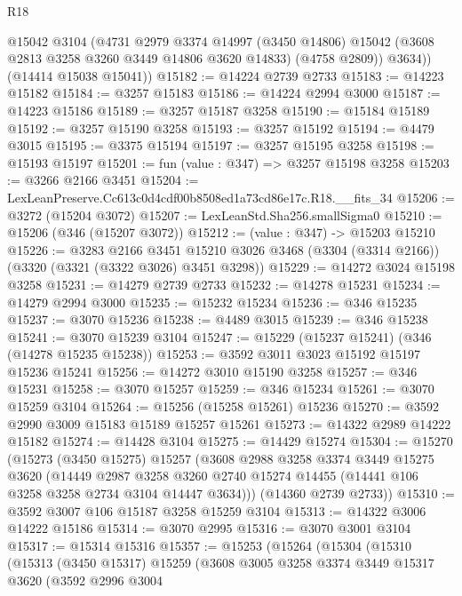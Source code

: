 \begin{lexlean}{R18}
\begin{coremodule}
          @15042
          @3104
          (@4731
            @2979
            @3374
            @14997
            (@3450 @14806)
            @15042
            (@3608 @2813 @3258 @3260 @3449 @14806 @3620 @14833)
            (@4758 @2809))
          @3634))
      (@14414 @15038 @15041))
@15182 := @14224 @2739 @2733
@15183 := @14223 @15182
@15184 := @3257 @15183
@15186 := @14224 @2994 @3000
@15187 := @14223 @15186
@15189 := @3257 @15187 @3258
@15190 := @15184 @15189
@15192 := @3257 @15190 @3258
@15193 := @3257 @15192
@15194 := @4479 @3015
@15195 := @3375 @15194
@15197 := @3257 @15195 @3258
@15198 := @15193 @15197
@15201 := fun (value : @347) => @3257 @15198 @3258
@15203 := @3266 @2166 @3451
@15204 := LexLeanPreserve.Cc613c0d4cdf00b8508ed1a73cd86e17c.R18.__fits_34
@15206 := @3272 (@15204 @3072)
@15207 := LexLeanStd.Sha256.smallSigma0
@15210 := @15206 (@346 (@15207 @3072))
@15212 := (value : @347) -> @15203 @15210
@15226 := @3283
    @2166
    @3451
    @15210
    @3026
    @3468
    (@3304 (@3314 @2166))
    (@3320 (@3321 (@3322 @3026) @3451 @3298))
@15229 := @14272 @3024 @15198 @3258
@15231 := @14279 @2739 @2733
@15232 := @14278 @15231
@15234 := @14279 @2994 @3000
@15235 := @15232 @15234
@15236 := @346 @15235
@15237 := @3070 @15236
@15238 := @4489 @3015
@15239 := @346 @15238
@15241 := @3070 @15239 @3104
@15247 := @15229 (@15237 @15241) (@346 (@14278 @15235 @15238))
@15253 := @3592 @3011 @3023 @15192 @15197 @15236 @15241
@15256 := @14272 @3010 @15190 @3258
@15257 := @346 @15231
@15258 := @3070 @15257
@15259 := @346 @15234
@15261 := @3070 @15259 @3104
@15264 := @15256 (@15258 @15261) @15236
@15270 := @3592 @2990 @3009 @15183 @15189 @15257 @15261
@15273 := @14322 @2989 @14222 @15182
@15274 := @14428 @3104
@15275 := @14429 @15274
@15304 := @15270
    (@15273
      (@3450 @15275)
      @15257
      (@3608
        @2988
        @3258
        @3374
        @3449
        @15275
        @3620
        (@14449
          @2987
          @3258
          @3260
          @2740
          @15274
          @14455
          (@14441 @106 @3258 @3258 @2734 @3104 @14447 @3634)))
      (@14360 @2739 @2733))
@15310 := @3592 @3007 @106 @15187 @3258 @15259 @3104
@15313 := @14322 @3006 @14222 @15186
@15314 := @3070 @2995
@15316 := @3070 @3001 @3104
@15317 := @15314 @15316
@15357 := @15253
    (@15264
      (@15304
        (@15310
          (@15313
            (@3450 @15317)
            @15259
            (@3608
              @3005
              @3258
              @3374
              @3449
              @15317
              @3620
              (@3592
                @2996
                @3004

\end{coremodule}
\end{lexlean}
